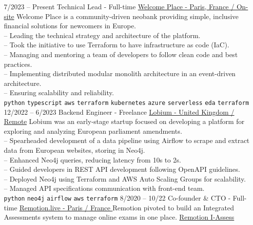 \documentclass[9pt]{developercv}
\begin{document}
\begin{entrylist}
	\entry
	{7/2023 -- Present}
	{Technical Lead - Full-time}
	{
		\href{https://www.linkedin.com/company/welcome-place/}{Welcome Place - Paris, France / On-site}}
	{
		Welcome Place is a community-driven neobank providing simple, inclusive financial solutions for newcomers in Europe. \\
		-- Leading the technical strategy and architecture of the platform. \\
		-- Took the initiative to use Terraform to have infrastructure as code (IaC). \\
		-- Managing and mentoring a team of developers to follow clean code and best practices. \\
		-- Implementing distributed modular monolith architecture in an event-driven architecture. \\
		-- Ensuring scalability and reliability. \\
		\texttt{python}\slashsep
		\texttt{typescript}\slashsep
		\texttt{aws}\slashsep
		\texttt{terraform}\slashsep
		\texttt{kubernetes}\slashsep
		\texttt{azure}\slashsep
		\texttt{serverless}\slashsep
		\texttt{eda}\slashsep
		\texttt{terraform}\slashsep
	}
		\entry
	{12/2022 -- 6/2023}
	{Backend Engineer - Freelance}
	{
		\href{https://www.linkedin.com/company/lobium/}{Lobium - United Kingdom / Remote}}
	{
		Lobium was an early-stage startup focused on developing a platform for exploring and analyzing European parliament amendments. \\
		-- Spearheaded development of a data pipeline using Airflow to scrape and extract data from European websites, storing in Neo4j. \\
		-- Enhanced Neo4j queries, reducing latency from 10s to 2s. \\
		-- Guided developers in REST API development following OpenAPI guidelines. \\
		-- Deployed Neo4j using Terraform and AWS Auto Scaling Groups for scalability. \\
		-- Managed API specifications communication with front-end team. \\
		\texttt{python}\slashsep
		\texttt{neo4j}\slashsep
		\texttt{airflow}\slashsep
		\texttt{aws}\slashsep
		\texttt{terraform}
	}
	\entry
	{8/2020 -- 10/22}
	{Co-founder \& CTO - Full-time}
	{\href{https://remotion.live/}{Remotion.live - Paris / France }}
	{Remotion pivoted to build an Integrated Assessments system to manage online exams in one place.
		\href{https://remotion.live/} {Remotion I-Assess} \\\\
}
\end{entrylist}
\end{document}
